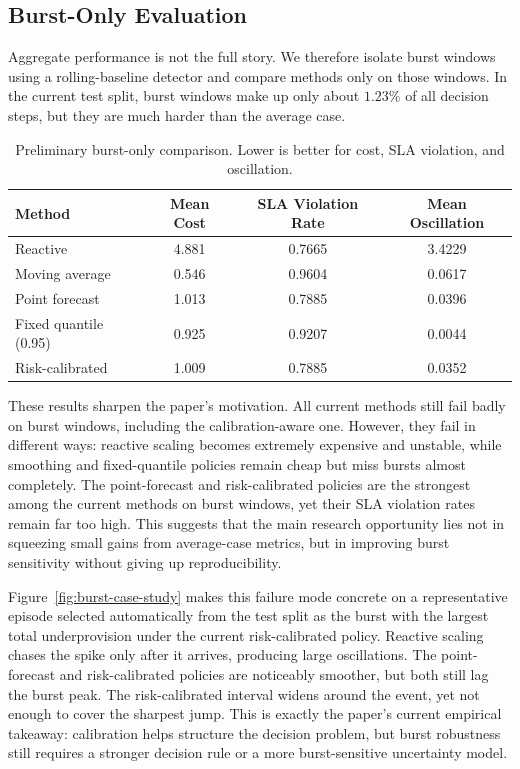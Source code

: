 \documentclass[11pt]{article}
\theoremstyle{plain}
\theoremstyle{definition}
\theoremstyle{remark}
\begin{document}
\subsection{Burst-Only Evaluation}
Aggregate performance is not the full story. We therefore isolate burst windows using a rolling-baseline detector and compare methods only on those windows. In the current test split, burst windows make up only about $1.23\%$ of all decision steps, but they are much harder than the average case.

\begin{table}[h]
\centering
\caption{Preliminary burst-only comparison. Lower is better for cost, SLA violation, and oscillation.}
\label{tab:burst-results}
\begin{tabular}{lccc}
\toprule
Method & Mean Cost & SLA Violation Rate & Mean Oscillation \\
\midrule
Reactive & 4.881 & 0.7665 & 3.4229 \\
Moving average & 0.546 & 0.9604 & 0.0617 \\
Point forecast & 1.013 & 0.7885 & 0.0396 \\
Fixed quantile (0.95) & 0.925 & 0.9207 & 0.0044 \\
Risk-calibrated & 1.009 & 0.7885 & 0.0352 \\
\bottomrule
\end{tabular}
\end{table}

These results sharpen the paper's motivation. All current methods still fail badly on burst windows, including the calibration-aware one. However, they fail in different ways: reactive scaling becomes extremely expensive and unstable, while smoothing and fixed-quantile policies remain cheap but miss bursts almost completely. The point-forecast and risk-calibrated policies are the strongest among the current methods on burst windows, yet their SLA violation rates remain far too high. This suggests that the main research opportunity lies not in squeezing small gains from average-case metrics, but in improving burst sensitivity without giving up reproducibility.

Figure~\ref{fig:burst-case-study} makes this failure mode concrete on a representative episode selected automatically from the test split as the burst with the largest total underprovision under the current risk-calibrated policy. Reactive scaling chases the spike only after it arrives, producing large oscillations. The point-forecast and risk-calibrated policies are noticeably smoother, but both still lag the burst peak. The risk-calibrated interval widens around the event, yet not enough to cover the sharpest jump. This is exactly the paper's current empirical takeaway: calibration helps structure the decision problem, but burst robustness still requires a stronger decision rule or a more burst-sensitive uncertainty model.
\end{document}
